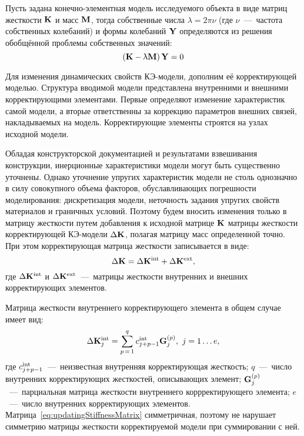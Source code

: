 Пусть задана конечно-элементная модель исследуемого объекта в виде матриц жесткости $ \mathbf{K} $ и масс $ \mathbf{M} $, тогда собственные числа $ \lambda = 2 \pi \nu $ (где $ \nu $~---~частота собственных колебаний) и формы колебаний $ \mathbf{Y} $ определяются из решения обобщённой проблемы собственных значений:
\begin{equation}
	\left( \mathbf{K} - \uplambda \mathbf{M} \right) \mathbf{Y} = 0
\end{equation}

Для изменения динамических свойств КЭ-модели, дополним её корректирующей моделью. Структура вводимой модели представлена внутренними и внешними корректирующими элементами. Первые определяют изменение характеристик самой модели, а вторые ответственны за коррекцию параметров внешних связей, накладываемых на модель. Корректирующие элементы строятся на узлах исходной модели. 

Обладая конструкторской документацией и результатами взвешивания конструкции, инерционные характеристики модели могут быть существенно уточнены. Однако уточнение упругих характеристик модели не столь однозначно в силу совокупного объема факторов, обуславливающих погрешности моделирования: дискретизация модели, неточность задания упругих свойств материалов и граничных условий. Поэтому будем вносить изменения только в матрицу жесткости путем добавления к исходной матрице $ \mathbf{K} $ матрицы жесткости корректирующей КЭ-модели $ \Delta \mathbf{K} $, полагая матрицу масс определенной точно. При этом корректирующая матрица жесткости записывается в виде:
\begin{equation}
	\Delta \mathbf{K} = \Delta \mathbf{K} ^ {\text{int}} + \Delta \mathbf{K} ^ {\text{ext}}, \label{eq:stiffMatrixDecomposition}
\end{equation}
где $ \Delta \mathbf{K} ^ {\text{int}} $ и $ \Delta \mathbf{K} ^ {\text{ext}} $~---~матрицы жесткости внутренних и внешних корректирующих элементов.

Матрица жесткости внутреннего корректирующего элемента в общем случае имеет вид:
\begin{equation}
	\Delta \mathbf{K} ^ {\text{int}}_j = \sum\limits_{p\,=\,1}^{q} c ^ {\text{int}}_{j+p-1} \mathbf{G}_j^{(p)}, \ j = 1 \hdots e, \label{eq:updatingStiffnessMatrix}
\end{equation}
где $ c ^ {\text{int}}_{j+p-1} $~---~неизвестная внутренняя корректирующая жесткость; $ q $~---~число внутренних корректирующих жесткостей, описывающих элемент; $ \mathbf{G}_j^{(p)} $~---~парциальная матрица жесткости внутреннего коррректирующего элемента; $ e $~---~число внутренних корректирующих элементов. Матрица~\eqref{eq:updatingStiffnessMatrix} симметричная, поэтому не нарушает симметрию матрицы жесткости корректируемой модели при суммировании с ней.

